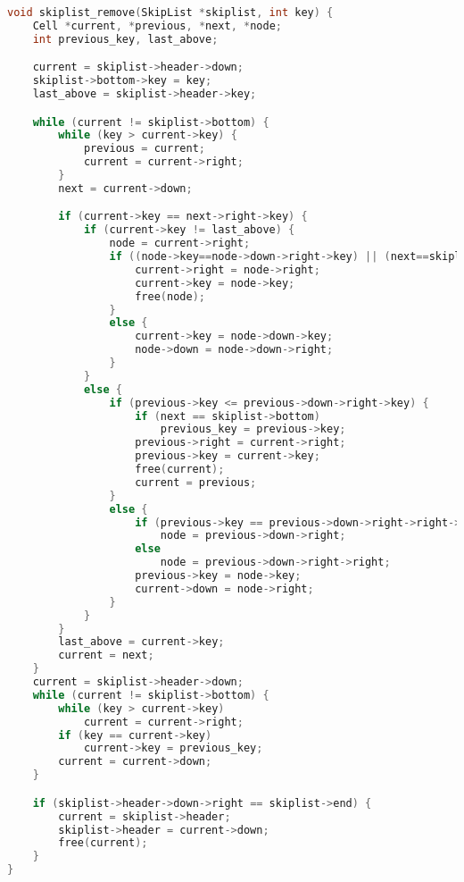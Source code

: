 \documentclass[paper=a4, fontsize=11pt]{scrartcl} %
\numberwithin{equation}{section}
\numberwithin{figure}{section}
\numberwithin{table}{section}
\numberwithin{definition}{section}
\numberwithin{theorem}{section}
\numberwithin{property}{section}
\numberwithin{proposition}{section}
\begin{document}
\begin{lstlisting}[caption=Algoritmo de remoção em TB 1-2-3 skip list, language=C]
void skiplist_remove(SkipList *skiplist, int key) {
    Cell *current, *previous, *next, *node;
    int previous_key, last_above;

    current = skiplist->header->down;
    skiplist->bottom->key = key;
    last_above = skiplist->header->key;

    while (current != skiplist->bottom) {
        while (key > current->key) {
            previous = current;
            current = current->right;
        }
        next = current->down;

        if (current->key == next->right->key) {
            if (current->key != last_above) {
                node = current->right;
                if ((node->key==node->down->right->key) || (next==skiplist->bottom)) {
                    current->right = node->right;
                    current->key = node->key;
                    free(node);
                }
                else {
                    current->key = node->down->key;
                    node->down = node->down->right;
                }
            }
            else {
                if (previous->key <= previous->down->right->key) {
                    if (next == skiplist->bottom)
                        previous_key = previous->key;
                    previous->right = current->right;
                    previous->key = current->key;
                    free(current);
                    current = previous;
                }
                else {
                    if (previous->key == previous->down->right->right->key)
                        node = previous->down->right;
                    else
                        node = previous->down->right->right;
                    previous->key = node->key;
                    current->down = node->right;
                }
            }
        }
        last_above = current->key;
        current = next;
    }
    current = skiplist->header->down;
    while (current != skiplist->bottom) {
        while (key > current->key)
            current = current->right;
        if (key == current->key)
            current->key = previous_key;
        current = current->down;
    }

    if (skiplist->header->down->right == skiplist->end) {
        current = skiplist->header;
        skiplist->header = current->down;
        free(current);
    }
}
\end{lstlisting}
\end{document}
